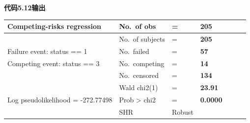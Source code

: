 \documentclass[
  chinese-hans,
  letterpaper,
  DIV=11,
  numbers=noendperiod]{scrreprt}
\newcounter{none} %
\begin{document}
\begin{tcolorbox}[enhanced jigsaw, arc=.35mm, bottomrule=.15mm, breakable, colback=white, colframe=quarto-callout-note-color-frame, left=2mm, leftrule=.75mm, opacityback=0, rightrule=.15mm, toprule=.15mm]

\vspace{-3mm}\textbf{代码5.12输出}\vspace{3mm}

{\def\LTcaptype{none} %
\begin{longtable}[]{@{}
  >{\raggedright\arraybackslash}p{}
  >{\raggedright\arraybackslash}p{}
  >{\raggedright\arraybackslash}p{}
  >{\raggedright\arraybackslash}p{}
  >{\raggedright\arraybackslash}p{}
  >{\raggedright\arraybackslash}p{}
  >{\raggedright\arraybackslash}p{}@{}}
\toprule\noalign{}
\begin{minipage}[b]{\linewidth}\raggedright
Competing-risks regression
\end{minipage} & \begin{minipage}[b]{\linewidth}\raggedright
No.~of obs
\end{minipage} & \begin{minipage}[b]{\linewidth}\raggedright
=
\end{minipage} & \begin{minipage}[b]{\linewidth}\raggedright
\textbf{205}
\end{minipage} & \begin{minipage}[b]{\linewidth}\raggedright
\end{minipage} & \begin{minipage}[b]{\linewidth}\raggedright
\end{minipage} & \begin{minipage}[b]{\linewidth}\raggedright
\end{minipage} \\
\midrule\noalign{}
\endhead
\bottomrule\noalign{}
\endlastfoot
& No.~of subjects & = & \textbf{205} & & & \\
Failure event: status == 1 & No.~failed & = & \textbf{57} & & & \\
Competing event: status == 3 & No.~competing & = & \textbf{14} & & & \\
& No.~censored & = & \textbf{134} & & & \\
& Wald chi2(1) & = & \textbf{23.91} & & & \\
Log pseudolikelihood = -272.77498 & Prob \textgreater{} chi2 & = &
\textbf{0.0000} & & & \\
& SHR & Robust


\end{longtable}}
\end{tcolorbox}
\end{document}
